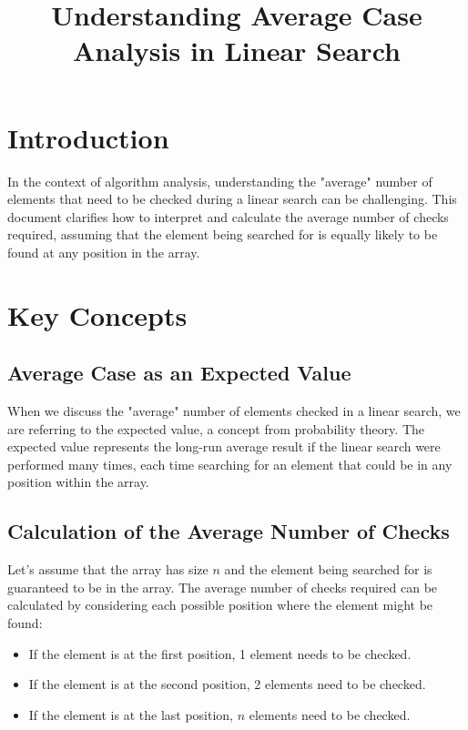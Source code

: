 \documentclass{article}
\title{Understanding Average Case Analysis in Linear Search}
\date{}
\begin{document}
\maketitle

\section*{Introduction}

In the context of algorithm analysis, understanding the "average" number of elements that need to be checked during a linear search can be challenging. This document clarifies how to interpret and calculate the average number of checks required, assuming that the element being searched for is equally likely to be found at any position in the array.

\section*{Key Concepts}

\subsection*{Average Case as an Expected Value}

When we discuss the "average" number of elements checked in a linear search, we are referring to the expected value, a concept from probability theory. The expected value represents the long-run average result if the linear search were performed many times, each time searching for an element that could be in any position within the array.

\subsection*{Calculation of the Average Number of Checks}

Let’s assume that the array has size \( n \) and the element being searched for is guaranteed to be in the array. The average number of checks required can be calculated by considering each possible position where the element might be found:

\begin{itemize}
    \item If the element is at the first position, 1 element needs to be checked.
    \item If the element is at the second position, 2 elements need to be checked.
    \item If the element is at the last position, \( n \) elements need to be checked.
\end{itemize}
\end{document}
